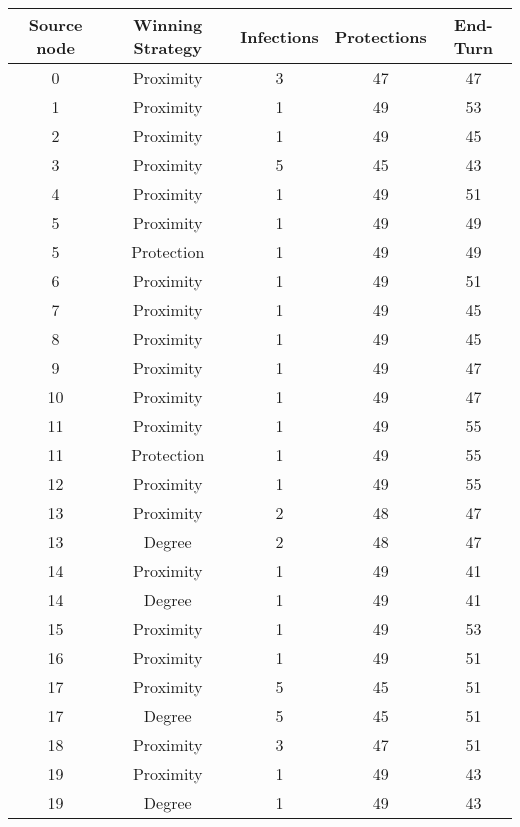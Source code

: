 \documentclass[results.tex]{subfiles}
\begin{document}
\begin{center}
  \begin{tabular}{| c || c | c | c | c |}
    \hline
    {\bfseries Source node} & {\bfseries Winning Strategy} & {\bfseries Infections} & {\bfseries Protections} & {\bfseries End-Turn} \\  %
    \hline\hline
    0 & Proximity & 3 & 47 & 47 \\ 
    \hline
    1 & Proximity & 1 & 49 & 53 \\ 
    \hline
    2 & Proximity & 1 & 49 & 45 \\ 
    \hline
    3 & Proximity & 5 & 45 & 43 \\ 
    \hline
    4 & Proximity & 1 & 49 & 51 \\ 
    \hline
    5 & Proximity & 1 & 49 & 49 \\ 
    \hline
    5 & Protection & 1 & 49 & 49 \\ 
    \hline
    6 & Proximity & 1 & 49 & 51 \\ 
    \hline
    7 & Proximity & 1 & 49 & 45 \\ 
    \hline
    8 & Proximity & 1 & 49 & 45 \\ 
    \hline
    9 & Proximity & 1 & 49 & 47 \\ 
    \hline
    10 & Proximity & 1 & 49 & 47 \\ 
    \hline
    11 & Proximity & 1 & 49 & 55 \\ 
    \hline
    11 & Protection & 1 & 49 & 55 \\ 
    \hline
    12 & Proximity & 1 & 49 & 55 \\ 
    \hline
    13 & Proximity & 2 & 48 & 47 \\ 
    \hline
    13 & Degree & 2 & 48 & 47 \\ 
    \hline
    14 & Proximity & 1 & 49 & 41 \\ 
    \hline
    14 & Degree & 1 & 49 & 41 \\ 
    \hline
    15 & Proximity & 1 & 49 & 53 \\ 
    \hline
    16 & Proximity & 1 & 49 & 51 \\ 
    \hline
    17 & Proximity & 5 & 45 & 51 \\ 
    \hline
    17 & Degree & 5 & 45 & 51 \\ 
    \hline
    18 & Proximity & 3 & 47 & 51 \\ 
    \hline
    19 & Proximity & 1 & 49 & 43 \\ 
    \hline
    19 & Degree & 1 & 49 & 43 \\ 

\end{tabular}
\end{center}
\end{document}
